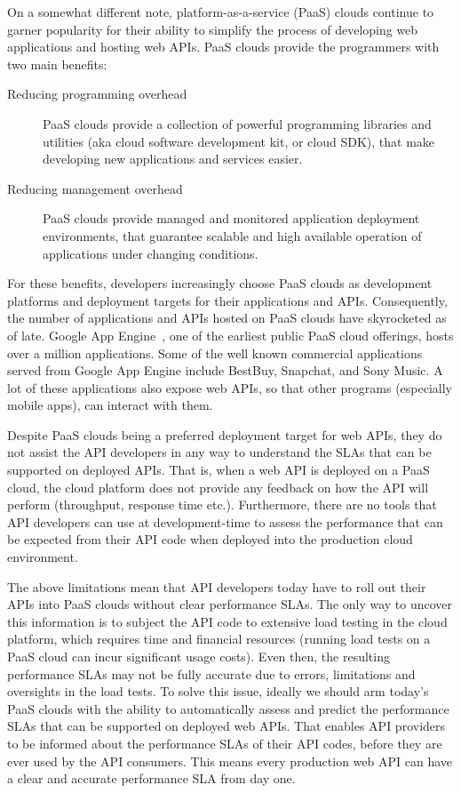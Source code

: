 On a somewhat different note, platform-as-a-service (PaaS) clouds continue to garner 
popularity for their ability to simplify the process of developing web applications and
hosting web APIs. PaaS clouds provide the programmers with two main benefits:

\begin{description}
\item[Reducing programming overhead] PaaS clouds provide a collection of powerful programming 
libraries and utilities (aka cloud software development kit, or cloud SDK), that make developing new applications 
and services easier.
\item[Reducing management overhead] PaaS clouds provide managed and monitored application deployment
environments, that guarantee scalable and high available operation of applications under changing conditions.
\end{description}

For these benefits, developers increasingly choose PaaS clouds as development platforms
and deployment targets for their applications and APIs. Consequently, the number of applications and 
APIs hosted on PaaS clouds have skyrocketed as of late. Google App Engine~\cite{gae}, one of the earliest
public PaaS cloud offerings, hosts over a million applications. Some of the
well known commercial applications served from Google App Engine include BestBuy, Snapchat, 
and Sony Music. A lot of these applications also expose web APIs, so that other
programs (especially mobile apps), can interact with them.

Despite PaaS clouds being a preferred deployment target for web APIs, they do not assist the API
developers in any way to understand the SLAs that can be supported on deployed APIs. That is,
when a web API is deployed on a PaaS cloud, the cloud platform does not provide any feedback 
on how the API will perform (throughput, response time etc.). Furthermore,
there are no tools that API developers can use at development-time to assess the performance
that can be expected from their API code when deployed into the production cloud environment.

The above limitations mean that API developers today have to roll out their APIs into PaaS
clouds without clear performance SLAs. The only way to uncover this information is to subject the API
code to extensive load testing in the cloud platform, which requires time and financial resources
(running load tests on a PaaS cloud can incur significant usage costs). Even then, the resulting
performance SLAs may not be fully accurate due to errors, limitations and oversights in the load tests.
To solve this issue, ideally we should arm today's PaaS clouds with the ability to automatically assess and
predict the performance SLAs that can be supported on deployed web APIs. 
That enables API providers to be informed about the performance
SLAs of their API codes, before they are ever used by the API consumers. This means
every production web API can have a clear and accurate performance SLA from day one.


